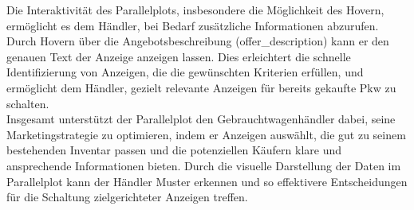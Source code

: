 Die Interaktivität des Parallelplots, insbesondere die Möglichkeit des Hovern, ermöglicht es dem Händler, bei Bedarf zusätzliche Informationen abzurufen. Durch Hovern über die Angebotsbeschreibung (offer\_description) kann er den genauen Text der Anzeige anzeigen lassen. Dies erleichtert die schnelle Identifizierung von Anzeigen, die die gewünschten Kriterien erfüllen, und ermöglicht dem Händler, gezielt relevante Anzeigen für bereits gekaufte Pkw zu schalten. \\

Insgesamt unterstützt der Parallelplot den Gebrauchtwagenhändler dabei, seine Marketingstrategie zu optimieren, indem er Anzeigen auswählt, die gut zu seinem bestehenden Inventar passen und die potenziellen Käufern klare und ansprechende Informationen bieten. Durch die visuelle Darstellung der Daten im Parallelplot kann der Händler Muster erkennen und so effektivere Entscheidungen für die Schaltung zielgerichteter Anzeigen treffen. \\